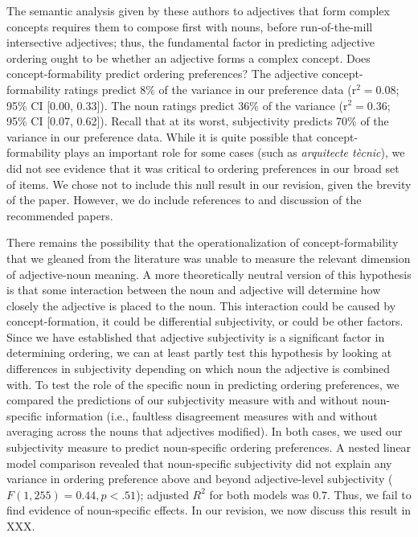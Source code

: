 \documentclass[12pt]{article}
\begin{document}
The semantic analysis given by these authors to adjectives that form complex concepts requires them to compose first with nouns, before run-of-the-mill intersective adjectives; thus, the fundamental factor in predicting adjective ordering ought to be whether an adjective forms a complex concept. Does concept-formability predict ordering preferences?
The adjective concept-formability ratings predict 8\% of the variance in our preference data (r$^{2}=0.08$; 95\% CI [0.00,  0.33]). The noun ratings predict 36\% of the variance (r$^{2}=0.36$; 95\% CI [0.07,  0.62]). Recall that at its worst, subjectivity predicts 70\% of the variance in our preference data.
While it is quite possible that concept-formability plays an important role for some cases (such as \emph{arquitecte t\`{e}cnic}), we did not see evidence that it was critical to ordering preferences in our broad set of items. We chose not to include this null result in our revision, given the brevity of the paper. 
However, we do include references to and discussion of the recommended papers. 

There remains the possibility that the operationalization of concept-formability that we gleaned from the literature was unable to measure the relevant dimension of adjective-noun meaning. A more theoretically neutral version of this hypothesis is that some interaction between the noun and adjective will determine how closely the adjective is placed to the noun. This interaction could be caused by concept-formation, it could be differential subjectivity, or could be other factors.
Since we have established that adjective subjectivity is a significant factor in determining ordering, we can at least partly test this hypothesis by looking at differences in subjectivity depending on which noun the adjective is combined with.
To test the role of the specific noun in predicting ordering preferences, we compared the predictions of our subjectivity measure with and without noun-specific information (i.e., faultless disagreement measures with and without averaging across the nouns that adjectives modified). In both cases, we used our subjectivity measure to predict noun-specific ordering preferences. A nested linear model comparison revealed that noun-specific subjectivity did not explain any variance in ordering preference above and beyond adjective-level subjectivity ($F(1,255) = 0.44, p < .51$); adjusted $R^2$ for both models was $0.7$. Thus, we fail to find evidence of noun-specific effects. In our revision, we now discuss this result in XXX.
\end{document}
